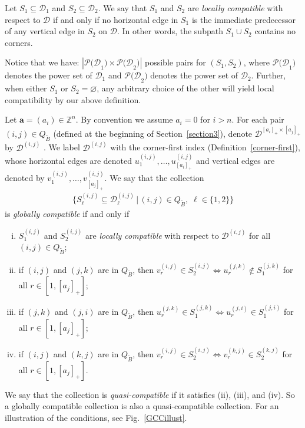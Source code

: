 \documentclass[pdftex]{sigma}
\numberwithin{equation}{section}
\begin{document}
\begin{Definition}\label{local_compatibility}
Let $S_1\subseteq \mathcal{D}_1$ and  $S_2 \subseteq \mathcal{D}_2$. We say that $S_1$ and $S_2$ are \emph{locally compatible} with respect to $\mathcal{D}$ if and only if no horizontal edge in $S_1$ is the immediate predecessor of any vertical edge in $S_2$ on $\mathcal{D}$. In other words, the subpath $S_1\cup S_2$ contains no corners.
\end{Definition}

\begin{Remark}
Notice that we have: $|\mathcal{P(D}_1)\times\mathcal{P(D}_2)|$ possible pairs for $(S_1,S_2)$, where $\mathcal{P(D}_1)$ denotes the power set of $\mathcal{D}_1$ and $\mathcal{P(D}_2)$ denotes the power set of $\mathcal{D}_2$. Further, when either $S_1$ or $S_2 = \varnothing$, any arbitrary choice of the other will yield local compatibility by our above def\/inition.
\end{Remark}

\begin{Definition}\label{definition:GCC}
Let $\mathbf{a}=(a_i)\in \mathbb{Z}^n$. By convention we assume $a_i=0$ for $i>n$.
For each pair $(i,j)\in Q_{\tilde B}$ (def\/ined at the beginning of Section~\ref{section3}), denote $\mathcal{D}^{[a_i]_+\times [a_j]_+}$ by $\mathcal{D}^{(i,j)}$ . We label  $\mathcal{D}^{(i,j)}$ with the corner-f\/irst index (Def\/inition~\ref{corner-first}), whose horizontal edges are denoted $u_{1}^{(i,j)},\dots,u_{[a_{i}]_{+}}^{(i,j)}$ and vertical edges are denoted by $v_{1}^{(i,j)},\dots,v_{[a_{j}]_{+}}^{(i,j)}$.
We say that the collection
\begin{gather*}
\big\{S_\ell^{(i,j)} \subseteq\mathcal{D}^{(i,j)}_\ell\,\big|\,  (i,j)\in Q_{\tilde B},\; \ell\in\{1,2\}\big\}
\end{gather*}
 is \emph{globally compatible} if and only if
\begin{enumerate}[(i)]\itemsep=0pt

 \item $S^{(i,j)}_1$ and $S^{(i,j)}_2$ are \emph{locally compatible} with respect to $\mathcal{D}^{(i,j)}$ for all $(i,j)\in Q_{\tilde B}$;

\item if $(i,j)$ and $(j,k)$ are in $Q_{\tilde B}$, then $v^{(i,j)}_r\in S^{(i,j)}_2\Longleftrightarrow u^{(j,k)}_r\not\in S^{(j,k)}_1$ for all $r\in[1,[a_{j}]_{+}]$;

\item if $(j,k)$ and $(j,i)$ are in $Q_{\tilde B}$, then $u^{(j,k)}_r \in S^{(j,k)}_1\Longleftrightarrow u^{(j,i)}_r \in S^{(j,i)}_1$ for all $r\in[1,[a_{j}]_{+}]$;

\item if $(i,j)$ and $(k,j)$ are in $Q_{\tilde B}$, then $v^{(i,j)}_r \in S^{(i,j)}_2\Longleftrightarrow v^{(k,j)}_r \in S^{(k,j)}_2$ for all $r\in[1,[a_{j}]_{+}]$.
\end{enumerate}
We say that the collection is \emph{quasi-compatible} if it satisf\/ies (ii), (iii), and (iv). So a globally compatible collection is also a quasi-compatible collection.
For an illustration of the conditions, see Fig.~\ref{GCCillust}.
\end{Definition}
\end{document}
